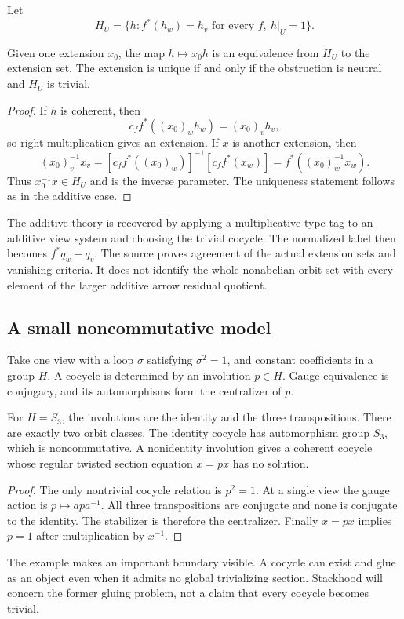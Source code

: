 Let
\[
 H_U=\{h:f^*(h_w)=h_v\text{ for every }f,\ h|_U=1\}.
\]

\begin{theorem}\label{KS32}
Given one extension \(x_0\), the map \(h\mapsto x_0h\) is an equivalence from \(H_U\) to the extension set. The extension is unique if and only if the obstruction is neutral and \(H_U\) is trivial.
\end{theorem}
\begin{proof}
If \(h\) is coherent, then
\[
 c_f f^*((x_0)_wh_w)=(x_0)_vh_v,
\]
so right multiplication gives an extension. If \(x\) is another extension, then
\[
 (x_0)_v^{-1}x_v
 =[c_f f^*((x_0)_w)]^{-1}[c_f f^*(x_w)]
 =f^*((x_0)_w^{-1}x_w).
\]
Thus \(x_0^{-1}x\in H_U\) and is the inverse parameter. The uniqueness statement follows as in the additive case.
\end{proof}
The additive theory is recovered by applying a multiplicative type tag to an additive view system and choosing the trivial cocycle. The normalized label then becomes \(f^*q_w-q_v\). The source proves agreement of the actual extension sets and vanishing criteria. It does not identify the whole nonabelian orbit set with every element of the larger additive arrow residual quotient.

\subsection{A small noncommutative model}
\begin{example}\label{KS33}
Take one view with a loop \(\sigma\) satisfying \(\sigma^2=1\), and constant coefficients in a group \(H\). A cocycle is determined by an involution \(p\in H\). Gauge equivalence is conjugacy, and its automorphisms form the centralizer of \(p\).

For \(H=S_3\), the involutions are the identity and the three transpositions. There are exactly two orbit classes. The identity cocycle has automorphism group \(S_3\), which is noncommutative. A nonidentity involution gives a coherent cocycle whose regular twisted section equation \(x=px\) has no solution.
\end{example}
\begin{proof}
The only nontrivial cocycle relation is \(p^2=1\). At a single view the gauge action is \(p\mapsto apa^{-1}\). All three transpositions are conjugate and none is conjugate to the identity. The stabilizer is therefore the centralizer. Finally \(x=px\) implies \(p=1\) after multiplication by \(x^{-1}\).
\end{proof}
The example makes an important boundary visible. A cocycle can exist and glue as an object even when it admits no global trivializing section. Stackhood will concern the former gluing problem, not a claim that every cocycle becomes trivial.


